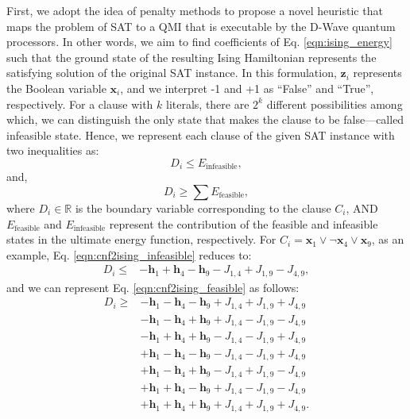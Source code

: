 \documentclass[fleqn,10pt]{wlscirep}
\begin{document}
First, we adopt the idea of penalty methods to propose a novel heuristic that maps the problem of SAT to a QMI that is executable by the D-Wave quantum processors. In other words, we aim to find coefficients of Eq. \eqref{eqn:ising_energy} such that the ground state of the resulting Ising Hamiltonian represents the satisfying solution of the original SAT instance. In this formulation, $\mathbf{z}_i$ represents the Boolean variable $\mathbf{x}_i$, and we interpret -1 and +1 as “False” and “True”, respectively. For a clause with ${k}$ literals, there are $2^k$ different possibilities among which, we can distinguish the only state that makes the clause to be false—called infeasible state. Hence, we represent each clause of the given SAT instance with two inequalities as:
\begin{equation}
	\label{eqn:cnf2ising_infeasible}
	D_i \leq E_{\mathrm{infeasible}},
\end{equation}
and,
\begin{equation}
	\label{eqn:cnf2ising_feasible}
	D_i \ge \sum{E_{\mathrm{feasible}}},
\end{equation}
where $D_i \in \mathbb{R}$ is the  boundary variable corresponding to the clause $C_i$, AND $E_{\mathrm{feasible}}$ and $E_{\mathrm{infeasible}}$ represent the contribution of the feasible and infeasible states in the ultimate energy function, respectively. For $C_i = \mathbf{x}_1 \vee \neg \mathbf{x}_4 \vee \mathbf{x}_9$, as an example, Eq. \eqref{eqn:cnf2ising_infeasible} reduces to: 
\begin{align*}
	D_i \leq &-\mathbf{h}_1 + \mathbf{h}_4 -\mathbf{h}_9 -J_{1,4} + J_{1,9} -J_{4,9},
\end{align*}
and we can represent Eq. \eqref{eqn:cnf2ising_feasible} as follows:
\begin{align*}
	D_i \ge &-\mathbf{h}_1 -\mathbf{h}_4 -\mathbf{h}_9 +J_{1,4} + J_{1,9} + J_{4,9}\\
		&-\mathbf{h}_1 -\mathbf{h}_4 + \mathbf{h}_9 +J_{1,4} -J_{1,9}-J_{4,9}\\
		&-\mathbf{h}_1 +\mathbf{h}_4 + \mathbf{h}_9 -J_{1,4} -J_{1,9} + J_{4,9}\\
		&+\mathbf{h}_1 -\mathbf{h}_4 -\mathbf{h}_9 - J_{1,4} -J_{1,9} + J_{4,9}\\
		&+\mathbf{h}_1 -\mathbf{h}_4 +\mathbf{h}_9 -J_{1,4} +J_{1,9} -J_{4,9}\\
		&+\mathbf{h}_1 + \mathbf{h}_4 -\mathbf{h}_9 +J_{1,4} -J_{1,9} -J_{4,9}\\
		&+\mathbf{h}_1 + \mathbf{h}_4 +\mathbf{h}_9 +J_{1,4} + J_{1,9} + J_{4,9}.
\end{align*}
\end{document}
